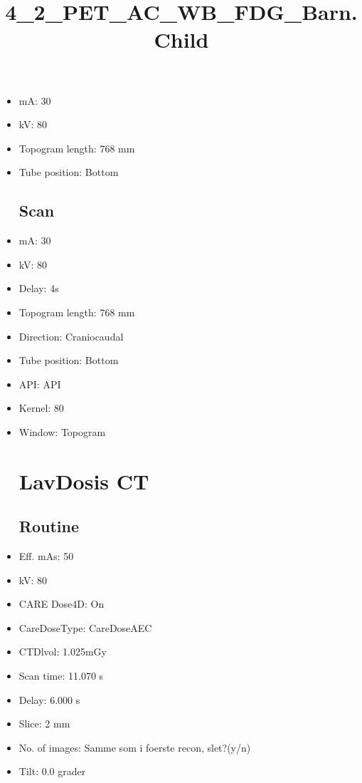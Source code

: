 \documentclass[12pt]{article}
\title{4\_2\_PET\_AC\_WB\_FDG\_Barn.Child}
\begin{document}
\maketitle
\newpage
\tableofcontents
\newpage
{}


\begin{itemize}\section{Topogram}
\subsection{Routine}
\item mA: 30\item kV: 80\item Topogram length: 768 mm\item Tube position: Bottom
\subsection{Scan}\item mA: 30\item kV: 80\item Delay: 4s\item Topogram length: 768 mm\item Direction: Craniocaudal\item Tube position: Bottom\item API: API \item Kernel: 80\item Window: Topogram
\section{LavDosis CT}
\subsection{Routine}
\item Eff. mAs: 50\item kV: 80\item CARE Dose4D: On\item CareDoseType: CareDoseAEC\item CTDlvol: 1.025mGy\item Scan time: 11.070 s\item Delay: 6.000 s\item Slice: 2 mm\item No. of images: Samme som i foerste recon, slet?(y/n)\item Tilt: 0.0 grader

\end{itemize}
\end{document}
